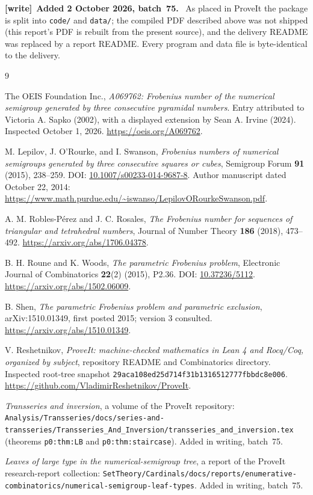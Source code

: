 \documentclass[11pt,a4paper]{article}
\numberwithin{equation}{section}
\theoremstyle{definition}
\newenvironment{writenote}[1][]{\par\smallskip\begingroup\small
 \noindent\textbf{[write]}\if\relax\detokenize{#1}\relax\else~\textbf{#1.}\fi\ }%
 {\par\endgroup\smallskip}
\begin{document}
\begin{writenote}[Added 2 October 2026, batch~75]
As placed in ProveIt the package is split into \texttt{code/} and
\texttt{data/}; the compiled PDF described above was not shipped (this
report's PDF is rebuilt from the present source), and the delivery README
was replaced by a report README. Every program and data file is
byte-identical to the delivery.
\end{writenote}

\begingroup
\raggedright
\begin{thebibliography}{9}

The OEIS Foundation Inc.,
\emph{A069762: Frobenius number of the numerical semigroup generated by
three consecutive pyramidal numbers}.
Entry attributed to Victoria A. Sapko (2002), with a displayed extension by
Sean A. Irvine (2024). Inspected October 1, 2026.
\url{https://oeis.org/A069762}.

M. Lepilov, J. O'Rourke, and I. Swanson,
\emph{Frobenius numbers of numerical semigroups generated by three
consecutive squares or cubes},
Semigroup Forum \textbf{91} (2015), 238--259.
DOI: \href{https://doi.org/10.1007/s00233-014-9687-8}{10.1007/s00233-014-9687-8}.
Author manuscript dated October 22, 2014:
\url{https://www.math.purdue.edu/~iswanso/LepilovORourkeSwanson.pdf}.

A. M. Robles-P\'erez and J. C. Rosales,
\emph{The Frobenius number for sequences of triangular and tetrahedral
numbers}, Journal of Number Theory \textbf{186} (2018), 473--492.
\url{https://arxiv.org/abs/1706.04378}.

B. H. Roune and K. Woods,
\emph{The parametric Frobenius problem},
Electronic Journal of Combinatorics \textbf{22}(2) (2015), P2.36.
DOI: \href{https://doi.org/10.37236/5112}{10.37236/5112}.
\url{https://arxiv.org/abs/1502.06009}.

B. Shen,
\emph{The parametric Frobenius problem and parametric exclusion},
arXiv:1510.01349, first posted 2015; version 3 consulted.
\url{https://arxiv.org/abs/1510.01349}.

V. Reshetnikov,
\emph{ProveIt: machine-checked mathematics in Lean 4 and Rocq/Coq,
organized by subject}, repository README and Combinatorics directory.
Inspected root-tree snapshot
\texttt{29aca108ed25d714f31b1316512777fbbdc8e006}.
\url{https://github.com/VladimirReshetnikov/ProveIt}.

\emph{Transseries and inversion}, a volume of the ProveIt repository:
\nolinkurl{Analysis/Transseries/docs/series-and-transseries/Transseries_And_Inversion/transseries_and_inversion.tex}
(theorems \texttt{p0:thm:LB} and \texttt{p0:thm:staircase}). Added in
writing, batch~75.

\emph{Leaves of large type in the numerical-semigroup tree}, a report of the
ProveIt research-report collection:
\nolinkurl{SetTheory/Cardinals/docs/reports/enumerative-combinatorics/numerical-semigroup-leaf-types}.
Added in writing, batch~75.

\end{thebibliography}
\endgroup
\end{document}
